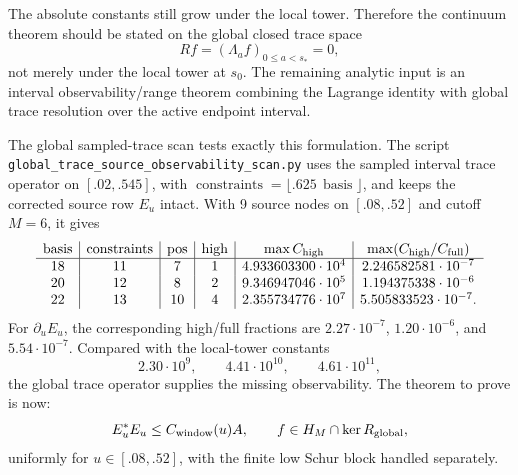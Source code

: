 \documentclass[11pt]{article}
\begin{document}
The absolute constants still grow under the local tower.  Therefore the
continuum theorem should be stated on the global closed trace space
\[
  Rf=(\Lambda_a f)_{0\le a<s_\ast}=0,
\]
not merely under the local tower at \(s_0\).  The remaining analytic input is
an interval observability/range theorem combining the Lagrange identity with
global trace resolution over the active endpoint interval.

The global sampled-trace scan tests exactly this formulation.  The script
\texttt{global\_trace\_source\_observability\_scan.py} uses the sampled
interval trace operator on \([.02,.545]\), with
\(\operatorname{constraints}=\lfloor .625\,\operatorname{basis}\rfloor\), and
keeps the corrected source row \(E_u\) intact.  With 9 source nodes on
\([.08,.52]\) and cutoff \(M=6\), it gives
\[
\begin{array}{c|c|c|c|c|c}
\operatorname{basis}&\operatorname{constraints}&\operatorname{pos}&
\operatorname{high}&\max C_{\rm high}&
\max(C_{\rm high}/C_{\rm full})\\\hline
18&11&7&1&4.933603300\cdot10^4&2.246582581\cdot10^{-7}\\
20&12&8&2&9.346947046\cdot10^5&1.194375338\cdot10^{-6}\\
22&13&10&4&2.355734776\cdot10^7&5.505833523\cdot10^{-7}.
\end{array}
\]
For \(\partial_uE_u\), the corresponding high/full fractions are
\(2.27\cdot10^{-7}\), \(1.20\cdot10^{-6}\), and \(5.54\cdot10^{-7}\).
Compared with the local-tower constants
\[
  2.30\cdot10^9,\qquad 4.41\cdot10^{10},\qquad 4.61\cdot10^{11},
\]
the global trace operator supplies the missing observability.  The theorem to
prove is now:
\[
  E_u^\ast E_u\le C_{\rm window}(u)A,\qquad
  f\in H_M\cap\ker R_{\rm global},
\]
uniformly for \(u\in[.08,.52]\), with the finite low Schur block handled
separately.
\end{document}
